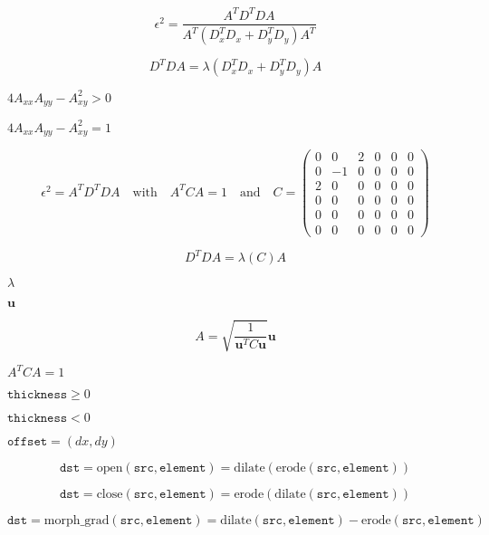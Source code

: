 \documentclass{article}
\begin{document}
\begin{equation*} \epsilon ^2=\frac{ A^T D^T D A }{ A^T (D_x^T D_x + D_y^T D_y) A^T } \end{equation*}
\pagebreak

\begin{equation*} D^T D A = \lambda \left( D_x^T D_x + D_y^T D_y\right) A \end{equation*}
\pagebreak

$ 4 A_{xx} A_{yy}- A_{xy}^2 > 0 $
\pagebreak

$ 4 A_{xx} A_{yy}- A_{xy}^2=1 $
\pagebreak

\begin{equation*} \epsilon ^2= A^T D^T D A \quad \text{with} \quad A^T C A =1 \quad \text{and} \quad C=\left(\begin{matrix} 0 & 0 & 2 & 0 & 0 & 0 \\ 0 & -1 & 0 & 0 & 0 & 0 \\ 2 & 0 & 0 & 0 & 0 & 0 \\ 0 & 0 & 0 & 0 & 0 & 0 \\ 0 & 0 & 0 & 0 & 0 & 0 \\ 0 & 0 & 0 & 0 & 0 & 0 \end{matrix} \right) \end{equation*}
\pagebreak

\begin{equation*} D^T D A = \lambda \left( C\right) A \end{equation*}
\pagebreak

$ \lambda$
\pagebreak

$\mathbf{u}$
\pagebreak

\begin{equation*} A = \sqrt{\frac{1}{\mathbf{u}^T C \mathbf{u}}} \mathbf{u} \end{equation*}
\pagebreak

$A^T C A =1$
\pagebreak

$\texttt{thickness} \ge 0$
\pagebreak

$\texttt{thickness}<0$
\pagebreak

$\texttt{offset}=(dx,dy)$
\pagebreak

\[\texttt{dst} = \mathrm{open} ( \texttt{src} , \texttt{element} )= \mathrm{dilate} ( \mathrm{erode} ( \texttt{src} , \texttt{element} ))\]
\pagebreak

\[\texttt{dst} = \mathrm{close} ( \texttt{src} , \texttt{element} )= \mathrm{erode} ( \mathrm{dilate} ( \texttt{src} , \texttt{element} ))\]
\pagebreak

\[\texttt{dst} = \mathrm{morph\_grad} ( \texttt{src} , \texttt{element} )= \mathrm{dilate} ( \texttt{src} , \texttt{element} )- \mathrm{erode} ( \texttt{src} , \texttt{element} )\]
\pagebreak
\end{document}
